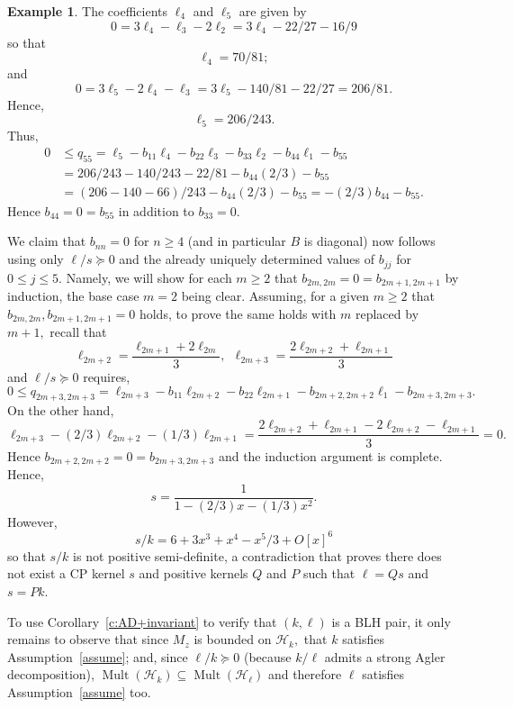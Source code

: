 \documentclass[a4paper,reqno,index]{amsart}
\numberwithin{equation}{section}
\newcommand{\Mult}{\operatorname{Mult}}
\newcommand{\cH}{\mathcal{H}}
\theoremstyle{definition}
\newtheorem{example}[theorem]{Example}
\begin{document}
\begin{example}
 
 The coefficients $\ell_4$ and $\ell_5$ are  given by
\[
 0 = 3\ell_4 - \ell_3 -2\ell_2 
  = 3\ell_4 - 22/27- 16/9 
\]
 so that
\[
 \ell_4 = 70/81;
\]
and 
\[
0 = 3 \ell_5 -2\ell_4-\ell_3 = 3\ell_5 -  140/81 - 22/27 = 206/81.
\]
Hence, 
\[
 \ell_5 = 206/243.
\]
Thus,
\[
\begin{split}
0 & \le  q_{55} =  \ell_5 - b_{11} \ell_4 - b_{22} \ell_3 -b_{33} \ell_2 -b_{44} \ell_1 -b_{55}   
\\ &  = 206/243 - 140/243 - 22/81 -b_{44} (2/3) -b_{55} 
\\ &  = (206-140-66)/243 - b_{44}(2/3)-b_{55}  = -(2/3)b_{44} -b_{55}.
 \end{split}
\]
Hence $b_{44}=0=b_{55}$ in addition to $b_{33}=0.$

We claim that $b_{nn}=0$ for $n\ge 4$ (and in particular
$B$ is diagonal) now follows 
using only $\ell/s \succeq 0$ and the already uniquely
determined values of $b_{jj}$ for $0\le j\le 5.$ Namely,
we will show  for each $m\ge 2$ that $b_{2m,2m}=0=b_{2m+1,2m+1}$
by induction, the base case $m=2$ being clear.
Assuming, for a given $m\ge 2$ that $b_{2m,2m},b_{2m+1,2m+1}=0$ holds,  
to prove the same holds with $m$ replaced by $m+1,$ recall that 
\[
 \ell_{2m+2} = \frac{\ell_{2m+1} + 2\ell_{2m}}{3}, \ \ 
 \ell_{2m+3} = \frac{2\ell_{2m+2} + \ell_{2m+1}}{3}
\]
and $\ell/s\succeq 0$ requires,
\[
 0 \le q_{2m+3,2m+3} = \ell_{2m+3} - b_{11} \ell_{2m+2} - b_{22}\ell_{2m+1} - b_{2m+2,2m+2} \ell_1 - b_{2m+3,2m+3}.
\]
 On the other hand,
\[
\ell_{2m+3} - (2/3) \ell_{2m+2} - (1/3)  \ell_{2m+1}
 = \frac{ 2\ell_{2m+2} + \ell_{2m+1} - 2 \ell_{2m+2} - \ell_{2m+1}}{3} =0.
\]
Hence $b_{2m+2,2m+2}=0=b_{2m+3,2m+3}$ and  the induction argument is complete. Hence, 
\[
 s= \frac{1}{1-(2/3)x-(1/3)x^2}.
\]
However, 
\[
s/k = 6 + 3 x^3 + x^4 - x^5/3 + O[x]^6
\]
so that $s/k$ is not positive semi-definite, a contradiction
that proves there does not exist   
a CP kernel $s$ and positive kernels $Q$ and $P$  such that $\ell=Qs$ and $s=Pk.$ 
 
 
\par 

 To use Corollary~\ref{c:AD+invariant} to verify that
  $(k,\ell)$ is a BLH pair, it only remains to observe that
  since $M_z$ is bounded on $\cH_k,$ that $k$ satisfies 
  Assumption~\ref{assume}; and, since $\ell/k\succeq0$
  (because $k/\ell$ admits a strong Agler decomposition),
   $\Mult(\cH_k)\subseteq \Mult(\cH_\ell)$ and therefore
   $\ell$ satisfies Assumption~\ref{assume} too. 
 

\end{example}
\end{document}
